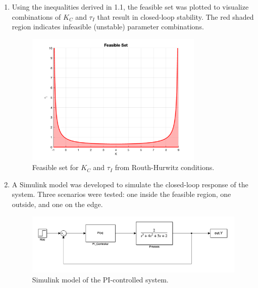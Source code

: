 \documentclass[12pt]{article}
\begin{document}
\begin{enumerate}
\begin{enumerate}
      \clearpage
      \item 
      Using the inequalities derived in 1.1, the feasible set was plotted to visualize combinations of $K_C$ and $\tau_I$ that result in closed-loop stability. The red shaded region indicates infeasible (unstable) parameter combinations.
  
      \begin{figure}[H]
        \centering
        \includegraphics[width=0.8\textwidth]{Figures/figure1-2a.png}
        \caption{Feasible set for $K_C$ and $\tau_I$ from Routh-Hurwitz conditions.}
      \end{figure}
  
      \item 
      A Simulink model was developed to simulate the closed-loop response of the system. Three scenarios were tested: one inside the feasible region, one outside, and one on the edge.
  
      \begin{figure}[H]
        \centering
        \includegraphics[width=1\textwidth]{Figures/figure1-3a.png}
        \caption{Simulink model of the PI-controlled system.}
      \end{figure}


\end{enumerate}
\end{enumerate}
\end{document}
